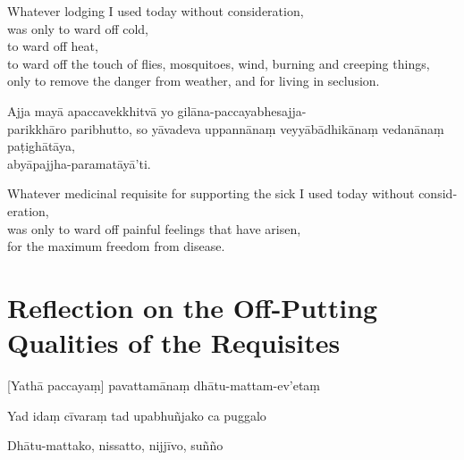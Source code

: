\begin{english}
  Whatever lodging I used today without consideration,\\
  was only to ward off cold,\\
  to ward off heat,\\
  to ward off the touch of flies, mosquitoes, wind, burning and creeping things,\\
  only to remove the danger from weather, and for living in seclusion.
\end{english}

Ajja mayā apaccavekkhitvā yo gilāna-paccayabhesajja-\\ parikkhāro paribhutto, so
yāvadeva uppannānaṃ veyyābādhikānaṃ vedanānaṃ paṭighātāya,\\
abyāpajjha-paramatāyā'ti.

\begin{english}
  Whatever medicinal requisite for supporting the sick I used today without consideration,\\
  was only to ward off painful feelings that have arisen,\\
  for the maximum freedom from disease.
\end{english}


\section[Reflection on the Off-Putting Qualities]{Reflection on the Off-Putting Qualities of the Requisites}


\begin{leader}
\end{leader}


[Yathā paccayaṃ] pavattamānaṃ dhātu-mattam-ev'etaṃ


Yad idaṃ cīvaraṃ tad upabhuñjako ca puggalo


Dhātu-mattako, nissatto, nijjīvo, suñño

